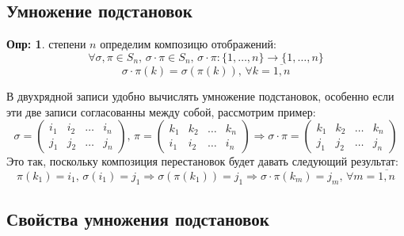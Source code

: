 \documentclass[12pt]{article}
\theoremstyle{definition}
\newtheorem{defn}{Опр:}
\begin{document}
\subsection*{Умножение подстановок}
\begin{defn}
	 степени $n$ определим композицю отображений:
	$$
		\forall \sigma, \pi \in S_n, \, \sigma{\cdot}\pi \in S_n, \,  \sigma{\cdot}\pi \colon \{1,\dotsc,n\} \to \{1,\dotsc, n\}
	$$
	$$
		\sigma{\cdot}\pi(k) = \sigma(\pi(k)), \, \forall k = \overline{1,n}
	$$
\end{defn}
В двухрядной записи удобно вычислять умножение подстановок, особенно если эти две записи согласованны между собой, рассмотрим пример:
$$
	\sigma = 
	\begin{pmatrix}
		i_1 & i_2 & \dotsc & i_n\\
		j_1 & j_2 & \dotsc & j_n
	\end{pmatrix}, \, 
	\pi =
	\begin{pmatrix}
		k_1 & k_2 & \dotsc & k_n\\
		i_1 & i_2 & \dotsc & i_n
	\end{pmatrix} \Rightarrow \sigma{\cdot}\pi = 
	\begin{pmatrix}
		k_1 & k_2 & \dotsc & k_n\\
		j_1 & j_2 & \dotsc & j_n
	\end{pmatrix}
$$
Это так, поскольку композиция перестановок будет давать следующий результат:
$$
	\pi(k_1) = i_1, \, \sigma(i_1) = j_1 \Rightarrow \sigma(\pi(k_1)) = j_1 \Rightarrow \sigma{\cdot}\pi(k_m) = j_m, \, \forall m = \overline{1,n}
$$
\subsection*{Свойства умножения  подстановок}
\end{document}

